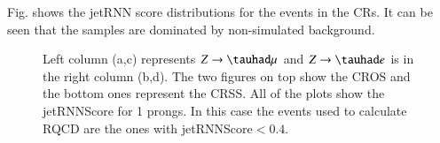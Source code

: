 Fig. shows the jetRNN score distributions for the events in the CRs. It can be seen that the samples are dominated by non-simulated background.

\begin{figure}[htbp]
	\centering
	\hfill
	\caption{Left column (a,c) represents $Z\to\tauhad\mu$ and $Z\to\tauhad e$ is in the right column (b,d). The two figures on top show the CROS and the bottom ones represent the CRSS. All of the plots show the jetRNNScore for 1 prongs. In this case the events used to calculate RQCD are the ones with jetRNNScore$<0.4$.  }
	\label{Fig12}
\end{figure}


